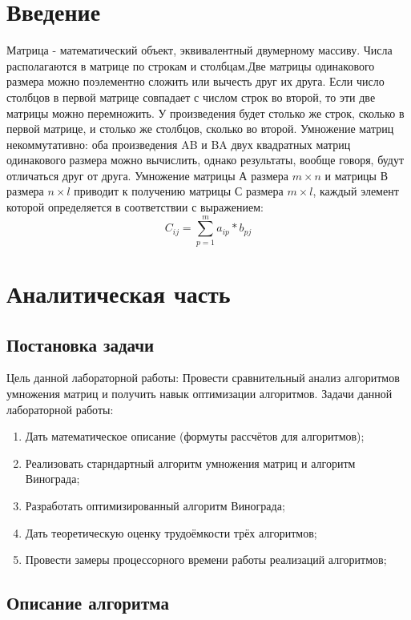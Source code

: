 \documentclass[a4paper]{article}
\newcommand{\suml}{\sum\limits}  %
\begin{document}
	\section*{Введение}
	Матрица - математический объект, эквивалентный двумерному массиву. Числа располагаются в матрице по строкам и столбцам.Две матрицы одинакового размера можно поэлементно сложить или вычесть друг их друга. Если число столбцов в первой матрице совпадает с числом строк во второй, то эти две матрицы можно перемножить. У произведения будет столько же строк, сколько в первой матрице, и столько же столбцов, сколько во второй. Умножение матриц некоммутативно: оба произведения AB и BA двух квадратных матриц одинакового размера можно вычислить, однако результаты, вообще говоря, будут отличаться друг от друга.  
	Умножение матрицы А  размера $m \times n$ и матрицы В  размера $n \times l$ приводит к получению матрицы С размера $m \times l$, каждый элемент которой определяется в соответствии с выражением:
 	\begin{equation}
 		C_{ij} = \suml_{p=1}^{m} a_{ip} * b_{pj}
 	\end{equation}
 	
	\clearpage
	\section {Аналитическая часть}
	\subsection {Постановка задачи}
	Цель данной лабораторной работы: Провести сравнительный анализ алгоритмов умножения матриц и получить навык оптимизации алгоритмов.
	Задачи данной лабораторной работы:
	\begin{enumerate}
		\item Дать математическое описание (формуты рассчётов для алгоритмов);
		\item Реализовать старндартный алгоритм умножения матриц и алгоритм Винограда;
		\item Разработать оптимизированный алгоритм Винограда;
		\item Дать теоретическую оценку трудоёмкости трёх алгоритмов;
		\item Провести замеры процессорного времени работы реализаций алгоритмов;
	\end{enumerate}
	
	\subsection{Описание алгоритма}
\end{document}
